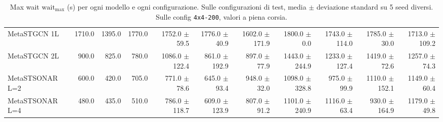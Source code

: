 \begin{table}
\begin{tabular}{@{}lrrrrrrrrrr@{}}
    MetaSTGCN 1L              & 1710.0  & 1395.0  & 1770.0  & 1752.0 {\fontsize{4}{4}\selectfont$\pm$59.5}  & 1776.0 {\fontsize{4}{4}\selectfont$\pm$40.9}  & 1602.0 {\fontsize{4}{4}\selectfont$\pm$171.9} & 1800.0 {\fontsize{4}{4}\selectfont$\pm$0.0}   & 1743.0 {\fontsize{4}{4}\selectfont$\pm$114.0} & 1785.0 {\fontsize{4}{4}\selectfont$\pm$30.0}  & 1713.0 {\fontsize{4}{4}\selectfont$\pm$109.2} \\
    MetaSTGCN 2L              & 900.0   & 825.0   & 780.0   & 1086.0 {\fontsize{4}{4}\selectfont$\pm$122.4} & 861.0 {\fontsize{4}{4}\selectfont$\pm$192.9}  & 897.0 {\fontsize{4}{4}\selectfont$\pm$77.9}   & 1443.0 {\fontsize{4}{4}\selectfont$\pm$244.9} & 1233.0 {\fontsize{4}{4}\selectfont$\pm$127.4} & 1419.0 {\fontsize{4}{4}\selectfont$\pm$72.6}  & 1257.0 {\fontsize{4}{4}\selectfont$\pm$74.3}  \\
    MetaSTSONAR L=2           & 600.0   & 420.0   & 705.0   & 771.0 {\fontsize{4}{4}\selectfont$\pm$78.6}   & 645.0 {\fontsize{4}{4}\selectfont$\pm$93.4}   & 948.0 {\fontsize{4}{4}\selectfont$\pm$32.0}   & 1098.0 {\fontsize{4}{4}\selectfont$\pm$328.8} & 975.0 {\fontsize{4}{4}\selectfont$\pm$99.9}   & 1110.0 {\fontsize{4}{4}\selectfont$\pm$152.1} & 1149.0 {\fontsize{4}{4}\selectfont$\pm$60.4}  \\
    MetaSTSONAR L=4           & 480.0   & 435.0   & 510.0   & 786.0 {\fontsize{4}{4}\selectfont$\pm$118.7}  & 609.0 {\fontsize{4}{4}\selectfont$\pm$123.9}  & 807.0 {\fontsize{4}{4}\selectfont$\pm$91.2}   & 1101.0 {\fontsize{4}{4}\selectfont$\pm$240.9} & 1116.0 {\fontsize{4}{4}\selectfont$\pm$63.4}  & 930.0 {\fontsize{4}{4}\selectfont$\pm$164.9}  & 1179.0 {\fontsize{4}{4}\selectfont$\pm$49.8}  \\
    \bottomrule
  \end{tabular}
  \caption{Max wait $\text{wait}_{\max}$ (s) per ogni modello e ogni configurazione. Sulle configurazioni di test, media $\pm$ deviazione standard su 5 seed diversi. Sulle config \texttt{4x4-200}, valori a piena corsia.}
  \label{tab:wait-full}
\end{table}
